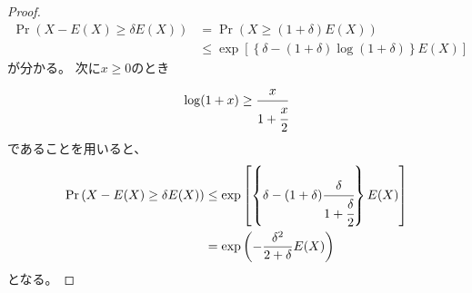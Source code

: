 \documentclass[a4paper, 10pt]{jsarticle}
\theoremstyle{definition}
\begin{document}
\begin{proof}
\begin{align}
		\Pr \left( X - E(X) \ge \delta E(X) \right)
		&= \Pr \left( X \ge (1 + \delta) E(X) \right) \\
		&\le \exp \left[ \left\{
			\delta - (1 + \delta) \log \left( 1 + \delta \right)
		\right\} E(X) \right]
	\end{align}
	が分かる。
	次に$x \ge 0$のとき
	\begin{align}
		\log (1 + x) \ge \cfrac{x}{1 + \cfrac{x}{2}}
	\end{align}
	であることを用いると、
	\begin{align}
		\Pr \left( X - E(X) \ge \delta E(X) \right)
		&\le \exp \left[ \left\{
			\delta - (1 + \delta) \cfrac{\delta}{1 + \cfrac{\delta}{2}}
		\right\} E(X) \right] \\
		&= \exp \left( -\frac{\delta^2}{2 + \delta} E(X) \right)
	\end{align}
	となる。


\end{proof}
\end{document}
